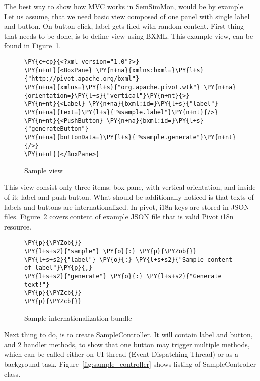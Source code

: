 The best way to show how MVC works in SemSimMon, would be by example. Let us assume, that we need basic view composed of one panel with single label and button. On button click, label gets filed with random content. First thing that needs to be done, is to define view using BXML. This example view, can be found in Figure~\ref{fig:sample_view}.

\begin{figure}[ht]
\centering
\begin{Verbatim}[commandchars=\\\{\},frame=single,framerule=0.2pt] 
\PY{c+cp}{<?xml version="1.0"?>}
\PY{n+nt}{<BoxPane} \PY{n+na}{xmlns:bxml=}\PY{l+s}{"http://pivot.apache.org/bxml"}
\PY{n+na}{xmlns=}\PY{l+s}{"org.apache.pivot.wtk"} \PY{n+na}{orientation=}\PY{l+s}{"vertical"}\PY{n+nt}{>}
\PY{n+nt}{<Label} \PY{n+na}{bxml:id=}\PY{l+s}{"label"} \PY{n+na}{text=}\PY{l+s}{"%sample.label"}\PY{n+nt}{/>}
\PY{n+nt}{<PushButton} \PY{n+na}{bxml:id=}\PY{l+s}{"generateButton"}
\PY{n+na}{buttonData=}\PY{l+s}{"%sample.generate"}\PY{n+nt}{/>}
\PY{n+nt}{</BoxPane>}
\end{Verbatim} 
\caption{Sample view}
\label{fig:sample_view}
\end{figure}

This view consist only three items: box pane, with vertical orientation, and inside of it: label and push button. What should be additionally noticed is that texts of labels and buttons are internationalized. In pivot, i18n keys are stored in JSON files. Figure~\ref{fig:i18n} covers content of example JSON file that is valid Pivot i18n resource. 

\begin{figure}[ht]
\centering
\begin{Verbatim}[commandchars=\\\{\},frame=single,framerule=0.2pt] 
\PY{p}{\PYZob{}}
\PY{l+s+s2}{"sample"} \PY{o}{:} \PY{p}{\PYZob{}}
\PY{l+s+s2}{"label"} \PY{o}{:} \PY{l+s+s2}{"Sample content of label"}\PY{p}{,}
\PY{l+s+s2}{"generate"} \PY{o}{:} \PY{l+s+s2}{"Generate text!"}
\PY{p}{\PYZcb{}}
\PY{p}{\PYZcb{}}
\end{Verbatim} 
\caption{Sample internationalization bundle}
\label{fig:i18n}
\end{figure}

Next thing to do, is to create SampleController. It will contain label and button, and 2 handler methods, to show that one button may trigger multiple methods, which can be called either on UI thread (Event Dispatching Thread) or as a background task. Figure~\ref{fig:sample_controller} shows listing of SampleController class. 

